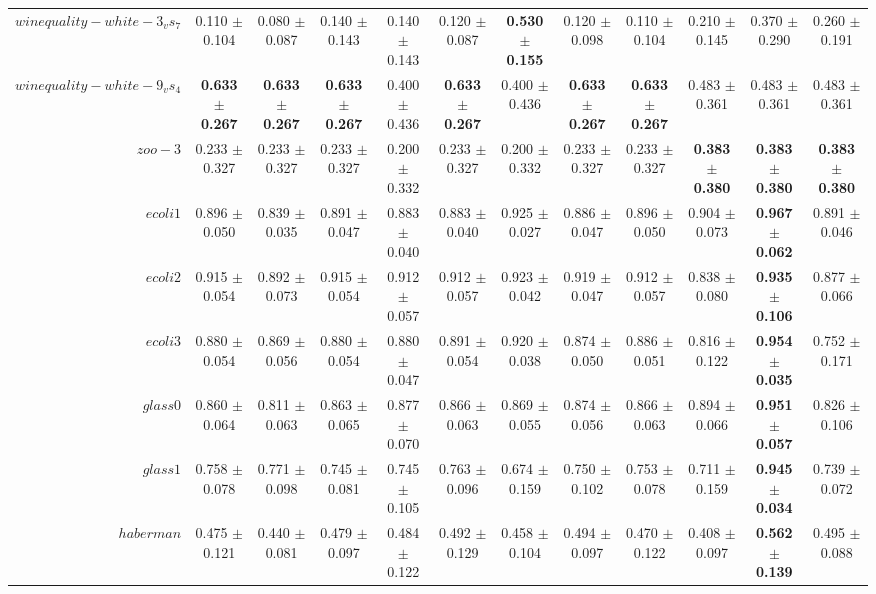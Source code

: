 \begin{table}[!ht]
{\begin{tabular}{r c c c c c c c c c c c}
$winequality-white-3_vs_7$ & 0.110 $\pm$ 0.104 & 0.080 $\pm$ 0.087 & 0.140 $\pm$ 0.143 & 0.140 $\pm$ 0.143 & 0.120 $\pm$ 0.087 & \textbf{0.530 $\pm$ 0.155} & 0.120 $\pm$ 0.098 & 0.110 $\pm$ 0.104 & 0.210 $\pm$ 0.145 & 0.370 $\pm$ 0.290 & 0.260 $\pm$ 0.191 \\
$winequality-white-9_vs_4$ & \textbf{0.633 $\pm$ 0.267} & \textbf{0.633 $\pm$ 0.267} & \textbf{0.633 $\pm$ 0.267} & 0.400 $\pm$ 0.436 & \textbf{0.633 $\pm$ 0.267} & 0.400 $\pm$ 0.436 & \textbf{0.633 $\pm$ 0.267} & \textbf{0.633 $\pm$ 0.267} & 0.483 $\pm$ 0.361 & 0.483 $\pm$ 0.361 & 0.483 $\pm$ 0.361 \\
$zoo-3$ & 0.233 $\pm$ 0.327 & 0.233 $\pm$ 0.327 & 0.233 $\pm$ 0.327 & 0.200 $\pm$ 0.332 & 0.233 $\pm$ 0.327 & 0.200 $\pm$ 0.332 & 0.233 $\pm$ 0.327 & 0.233 $\pm$ 0.327 & \textbf{0.383 $\pm$ 0.380} & \textbf{0.383 $\pm$ 0.380} & \textbf{0.383 $\pm$ 0.380} \\
$ecoli1$ & 0.896 $\pm$ 0.050 & 0.839 $\pm$ 0.035 & 0.891 $\pm$ 0.047 & 0.883 $\pm$ 0.040 & 0.883 $\pm$ 0.040 & 0.925 $\pm$ 0.027 & 0.886 $\pm$ 0.047 & 0.896 $\pm$ 0.050 & 0.904 $\pm$ 0.073 & \textbf{0.967 $\pm$ 0.062} & 0.891 $\pm$ 0.046 \\
$ecoli2$ & 0.915 $\pm$ 0.054 & 0.892 $\pm$ 0.073 & 0.915 $\pm$ 0.054 & 0.912 $\pm$ 0.057 & 0.912 $\pm$ 0.057 & 0.923 $\pm$ 0.042 & 0.919 $\pm$ 0.047 & 0.912 $\pm$ 0.057 & 0.838 $\pm$ 0.080 & \textbf{0.935 $\pm$ 0.106} & 0.877 $\pm$ 0.066 \\
$ecoli3$ & 0.880 $\pm$ 0.054 & 0.869 $\pm$ 0.056 & 0.880 $\pm$ 0.054 & 0.880 $\pm$ 0.047 & 0.891 $\pm$ 0.054 & 0.920 $\pm$ 0.038 & 0.874 $\pm$ 0.050 & 0.886 $\pm$ 0.051 & 0.816 $\pm$ 0.122 & \textbf{0.954 $\pm$ 0.035} & 0.752 $\pm$ 0.171 \\
$glass0$ & 0.860 $\pm$ 0.064 & 0.811 $\pm$ 0.063 & 0.863 $\pm$ 0.065 & 0.877 $\pm$ 0.070 & 0.866 $\pm$ 0.063 & 0.869 $\pm$ 0.055 & 0.874 $\pm$ 0.056 & 0.866 $\pm$ 0.063 & 0.894 $\pm$ 0.066 & \textbf{0.951 $\pm$ 0.057} & 0.826 $\pm$ 0.106 \\
$glass1$ & 0.758 $\pm$ 0.078 & 0.771 $\pm$ 0.098 & 0.745 $\pm$ 0.081 & 0.745 $\pm$ 0.105 & 0.763 $\pm$ 0.096 & 0.674 $\pm$ 0.159 & 0.750 $\pm$ 0.102 & 0.753 $\pm$ 0.078 & 0.711 $\pm$ 0.159 & \textbf{0.945 $\pm$ 0.034} & 0.739 $\pm$ 0.072 \\
$haberman$ & 0.475 $\pm$ 0.121 & 0.440 $\pm$ 0.081 & 0.479 $\pm$ 0.097 & 0.484 $\pm$ 0.122 & 0.492 $\pm$ 0.129 & 0.458 $\pm$ 0.104 & 0.494 $\pm$ 0.097 & 0.470 $\pm$ 0.122 & 0.408 $\pm$ 0.097 & \textbf{0.562 $\pm$ 0.139} & 0.495 $\pm$ 0.088 \\

\end{tabular}}
\end{table}
